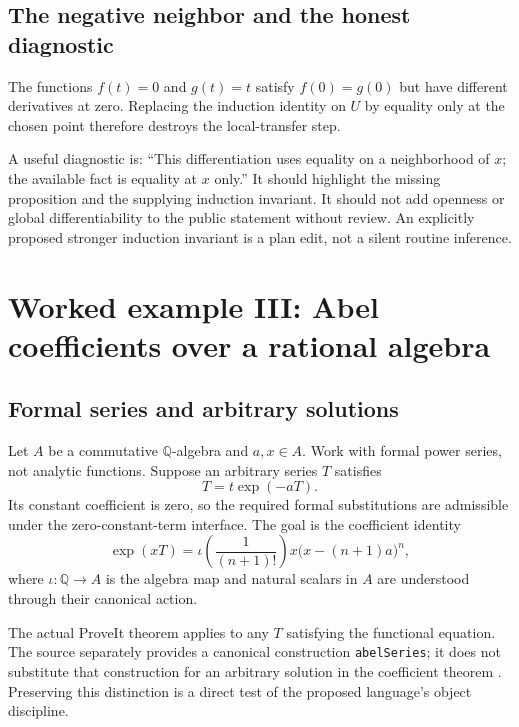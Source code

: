 \documentclass[11pt,a4paper]{article}
\newcommand{\code}[1]{\nolinkurl{#1}}
\newcommand{\Q}{\mathbb{Q}}
\theoremstyle{definition}
\begin{document}
\subsection{The negative neighbor and the honest diagnostic}
The functions $f(t)=0$ and $g(t)=t$ satisfy $f(0)=g(0)$ but have different
derivatives at zero. Replacing the induction identity on $U$ by equality only
at the chosen point therefore destroys the local-transfer step.

A useful diagnostic is: ``This differentiation uses equality on a neighborhood
of $x$; the available fact is equality at $x$ only.'' It should highlight the
missing proposition and the supplying induction invariant. It should not add
openness or global differentiability to the public statement without review.
An explicitly proposed stronger induction invariant is a plan edit, not a silent
routine inference.

\section{Worked example III: Abel coefficients over a rational algebra}
\label{sec:abel}
\subsection{Formal series and arbitrary solutions}
Let $A$ be a commutative $\Q$-algebra and $a,x\in A$. Work with formal power
series, not analytic functions. Suppose an arbitrary series $T$ satisfies
\[
 T=t\exp(-aT).
\]
Its constant coefficient is zero, so the required formal substitutions are
admissible under the zero-constant-term interface. The goal is the coefficient
identity
\begin{equation}
 [t^{n+1}]\exp(xT)
 =\iota\!\left(\frac1{(n+1)!}\right)
       x\bigl(x-(n+1)a\bigr)^n,
 \label{eq:abel}
\end{equation}
where $\iota:\Q\to A$ is the algebra map and natural scalars in $A$ are understood
through their canonical action.

The actual ProveIt theorem applies to any $T$ satisfying the functional equation.
The source separately provides a canonical construction \code{abelSeries}; it
does not substitute that construction for an arbitrary solution in the
coefficient theorem \cite{p-abel}. Preserving this distinction is a direct test
of the proposed language's object discipline.
\end{document}
